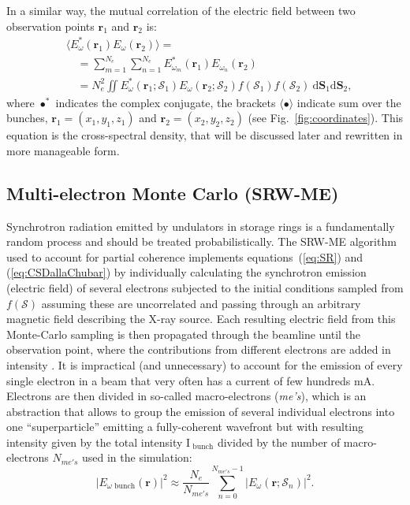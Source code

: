 \documentclass{iucr}              %
\begin{document}
In a similar way, the mutual correlation of the electric field between two observation points $\textbf{r}_1$ and $\textbf{r}_2$ is:
\begin{equation}\label{eq:CSDallaChubar}
\begin{split}
      &\big\langle E^*_{\omega}(\textbf{r}_1) E_{\omega}(\textbf{r}_2)\big\rangle = \\
      &\quad = \sum_{m=1}^{N_e} \sum_{n=1}^{N_e} E^*_{\omega_{m}}(\textbf{r}_1) E_{\omega_{n}}(\textbf{r}_2)\\
      &\quad = N_e^2\iint
      E^*_{\omega}(\textbf{r}_1;\mathcal{S}_1)
      E_{\omega}(\textbf{r}_2;\mathcal{S}_2)
      f(\mathcal{S}_1) f(\mathcal{S}_2)~
      \text{d}\textbf{S}_1 \text{d}\textbf{S}_2,
\end{split}
\end{equation}
where $\bullet^*$ indicates the complex conjugate, the brackets $\langle \bullet \rangle$ indicate sum over the bunches, $\textbf{r}_1=(x_1,y_1,z_1)$ and $\textbf{r}_2=(x_2,y_2,z_2)$ (see Fig.~\ref{fig:coordinates}). This equation is the cross-spectral density, that will be discussed later and rewritten in more manageable form.

\subsection{Multi-electron Monte Carlo (SRW-ME)}

Synchrotron radiation emitted by undulators in storage rings is a fundamentally random process and should be treated probabilistically. The SRW-ME algorithm used to account for partial coherence implements equations~(\ref{eq:SR}) and (\ref{eq:CSDallaChubar}) by individually calculating the synchrotron emission (electric field) of several electrons subjected to the initial conditions sampled from $f(\mathcal{S})$ assuming these are uncorrelated and passing through an arbitrary magnetic field describing the X-ray source. Each resulting electric field from this Monte-Carlo sampling is then propagated through the beamline until the observation point, where the contributions from different electrons are added in intensity \cite{codeSRW_ME}. It is impractical (and unnecessary) to account for the emission of every single electron in a beam that very often has a current of few hundreds mA. Electrons are then divided in so-called macro-electrons (\textit{me's}), which is an abstraction that allows to group the emission of several individual electrons into one ``superparticle'' emitting a fully-coherent wavefront but with resulting intensity given by the total intensity $\text{I}_\text{~bunch}$ divided by the number of macro-electrons $N_{me's}$ used in the simulation:
\begin{equation}
|E_{\omega\text{~bunch}}(\textbf{r})|^2 \approx \frac{N_e}{N_{me's}}\sum_{n=0}^{N_{me's} - 1}\big| E_\omega(\textbf{r};\mathcal{S}_n)\big|^2.
\label{eq:SR_SRW}
\end{equation}
\end{document}
